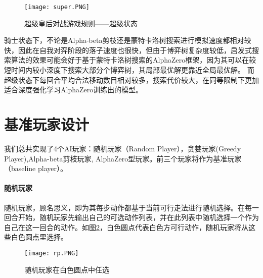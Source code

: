 \begin{figure}[H]
    \centering
    \texttt{[image: super.PNG]}
    \caption[rules-super]{%
        超级皇后对战游戏规则——超级状态%
      }
    \label{fig:super}
\end{figure}
骑士状态下，不论是Alpha-beta剪枝还是蒙特卡洛树搜索进行模拟速度都相对较快，因此在自我对弈阶段的落子速度也很快，但由于博弈树复杂度较低，启发式搜索算法的效果可能会好于基于蒙特卡洛树搜索的AlphaZero框架，因为其可以在较短时间内较小深度下搜索大部分个博弈树，其局部最优解更靠近全局最优解。
而超级状态下每回合平均合法移动数目相对较多，搜索代价较大，在同等限制下更加适合深度强化学习AlphaZero训练出的模型。

\section{基准玩家设计}
我们总共实现了4个AI玩家：随机玩家（Random Player），贪婪玩家(Greedy Player),Alpha-beta剪枝玩家, AlphaZero型玩家。前三个玩家将作为基准玩家（baseline player）。
\paragraph{随机玩家}
随机玩家，顾名思义，即为其每步动作都基于当前可行走法进行随机选择。在每一回合开始，随机玩家先输出自己的可选动作列表，并在此列表中随机选择一个作为自己在这一回合的动作。如图\ref{fig:super}，白色圆点代表白色方可行动作，随机玩家将从这些白色圆点里选择。
\begin{figure}[H]
    \centering
    \texttt{[image: rp.PNG]}
    \caption[rp]{%
        随机玩家在白色圆点中任选%
      }
    \label{fig:super}
\end{figure}

